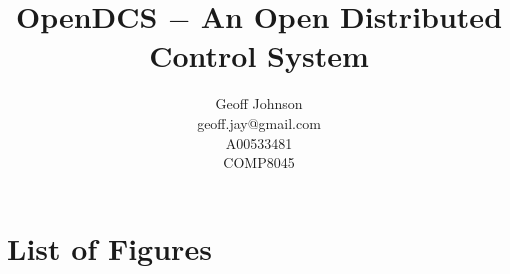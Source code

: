 \documentclass[11pt]{article}
\begin{document}
\nocite{*}

  \title{%
    OpenDCS $-$ An Open Distributed Control System\vspace{2em}
  }

  \author{%
    Geoff Johnson \vspace{0.5em} \\
    geoff.jay@gmail.com \vspace{0.5em} \\
    A00533481 \vspace{0.5em} \\
    COMP8045 \vspace{0.5em}
  }

  \maketitle
  \thispagestyle{empty}
  \newpage
  \mbox{}
  \thispagestyle{empty}

  \newpage
  \addtocounter{page}{-1}
  \tableofcontents

  \newpage


  

  \newpage
  

  \newpage
  

  \newpage
  

  \newpage
  

  \newpage
  

  \newpage
  

  \newpage
  

	\newpage
  


  \newpage
  \printbibliography%

  \newpage
  \addappheadtotoc%
  \appendix
  \appendixpage%

  \section{List of Figures}\label{app:list-figures}
    \listoffigures
\end{document}
